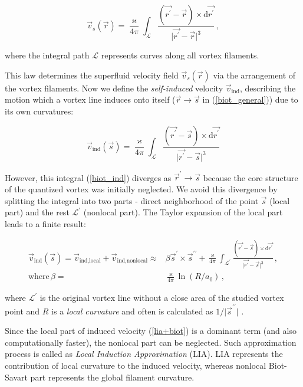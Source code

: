 \begin{equation}
\vec{v}_s(\vec{r}) = \frac{\varkappa}{4\pi} \int_{\mathcal{L}} \frac{(\vec{r^{\prime}} - \vec{r}) \times \text{d}\vec{r^{\prime}}}{\vert \vec{r^{\prime}} - \vec{r} \vert^3}\,,
\label{biot_general}
\end{equation}

where the integral path $\mathcal{L}$ represents curves along all vortex filaments.

This law determines the superfluid velocity field $\vec{v}_s(\vec{r})$ via the arrangement of the vortex filaments. Now we define the \textit{self-induced} velocity $\vec{v}_{\text{ind}}$, describing the motion which a vortex line induces onto itself ($\vec{r} \rightarrow \vec{s}$ in (\ref{biot_general})) due to its own curvatures:

\begin{equation}
\vec{v}_{\text{ind}}(\vec{s}) = \frac{\varkappa}{4\pi} \int_{\mathcal{L}} \frac{(\vec{r^{\prime}} - \vec{s}) \times \text{d}\vec{r^{\prime}}}{\vert \vec{r^{\prime}} - \vec{s} \vert^3}
\label{biot_ind}
\end{equation}

However, this integral (\ref{biot_ind}) diverges as $\vec{r}^{\prime} \rightarrow \vec{s}$ because the core structure
of the quantized vortex was initially neglected. We avoid this divergence by splitting the integral into two parts - direct neighborhood of the point $\vec{s}$ (local part) and the rest $\mathcal{L}^{\prime}$ (nonlocal part). The Taylor expansion of the local part leads \cite{schwarz} to a finite result:

\begin{align}
\vec{v}_{\text{ind}}(\vec{s})
= \vec{v}_{\text{ind,local}} + \vec{v}_{\text{ind,nonlocal}}
\approx& \beta \vec{s}^{\prime} \times \vec{s}^{\prime \prime} + \frac{\varkappa}{4\pi} \int_{\mathcal{L}^{\prime}} \frac{(\vec{r^{\prime}} - \vec{s}) \times \text{d}\vec{r^{\prime}}}{\vert \vec{r^{\prime}} - \vec{s} \vert^3}\,,
\label{lia+biot}
\\
\text{where}\, \beta =& \frac{\varkappa}{4\pi} \ln(R / a_0)\,,
\label{beta}
\end{align}

where $\mathcal{L}^{\prime}$ is the original vortex line without a close area of the studied vortex point and $R$ is a \textit{local curvature} and often is calculated as $1 / \vert \vec{s}^{\prime\prime} \vert$ \cite{schwarz}.

Since the local part of induced velocity (\ref{lia+biot}) is a dominant term (and also computationally faster), the nonlocal part can be neglected. Such approximation process is called as \textit{Local Induction Approximation} (LIA). LIA represents the contribution of local curvature to the induced velocity, whereas nonlocal Biot-Savart part represents the global filament curvature.

